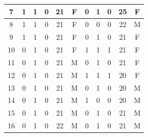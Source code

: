 \begin{table}[H]
{\begin{tabular}{|c|c|c|c|c|c|c|c|c|c|c|}
7                                                                              & 1           & 1           & 0           & 21           & F            & 0           & 1           & 0           & 25           & F            \\ \hline
8                                                                              & 1           & 1           & 0           & 21           & F            & 0           & 0           & 0           & 22           & M            \\ \hline
9                                                                              & 1           & 1           & 0           & 21           & F            & 0           & 1           & 0           & 21           & F            \\ \hline
10                                                                             & 0           & 1           & 0           & 21           & F            & 1           & 1           & 1           & 21           & F            \\ \hline
11                                                                             & 0           & 1           & 0           & 21           & M            & 0           & 1           & 0           & 21           & F            \\ \hline
12                                                                             & 0           & 1           & 0           & 21           & M            & 1           & 1           & 1           & 20           & F            \\ \hline
13                                                                             & 0           & 1           & 0           & 21           & M            & 0           & 1           & 0           & 20           & M            \\ \hline
14                                                                             & 0           & 1           & 0           & 21           & M            & 1           & 0           & 0           & 20           & M            \\ \hline
15                                                                             & 0           & 1           & 0           & 21           & M            & 0           & 1           & 0           & 21           & M            \\ \hline
16                                                                             & 0           & 1           & 0           & 22           & M            & 0           & 1           & 0           & 21           & M            \\ \hline

\end{tabular}}
\end{table}
